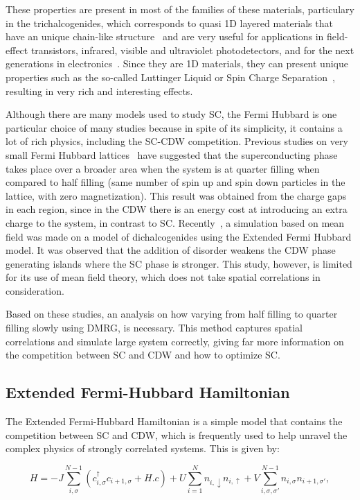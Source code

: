 \documentclass{article}
\begin{document}
These properties are present in most of the families of these materials, particulary in the trichalcogenides, which corresponds to quasi 1D layered materials that have an unique chain-like structure~\cite{trical} and are very useful for applications in field-effect transistors, infrared, visible and ultraviolet photodetectors, and for the next generations in electronics~\cite{trical}. Since they are 1D materials, they can present unique properties such as the so-called Luttinger Liquid or Spin Charge Separation~\cite{Giamarchi}, resulting in very rich and interesting effects.

Although there are many models used to study SC, the Fermi Hubbard is one particular choice of many studies because in spite of its simplicity, it contains a lot of rich physics, including the SC-CDW competition. Previous studies on very small Fermi Hubbard lattices~\cite{quarterfilling} have suggested that the superconducting phase takes place over a broader area when the system is at quarter filling when compared to half filling (same number of spin up and spin down particles in the lattice, with zero magnetization). This result was obtained from the charge gaps in each region, since in the CDW there is an energy cost at introducing an extra charge to the system, in contrast to SC. Recently~\cite{MeanField}, a simulation based on mean field was made on a model of dichalcogenides using the Extended Fermi Hubbard model. It was observed that the addition of disorder weakens the CDW phase generating islands where the SC phase is stronger. This study, however, is limited for its use of mean field theory, which does not take spatial correlations in consideration. 

Based on these studies, an analysis on how varying from half filling to quarter filling slowly using DMRG, is necessary. This method captures spatial correlations and simulate large system correctly, giving far more information on the competition between SC and CDW and how to optimize SC.

\subsection{Extended Fermi-Hubbard Hamiltonian}

The Extended Fermi-Hubbard Hamiltonian is a simple model that contains the competition between SC and CDW, which is frequently used to help unravel the complex physics of strongly correlated systems. This is given by:

\begin{equation}
    H=-J\sum^{N-1}_{i,\sigma}{(c^{\dagger}_{i,\sigma}c_{i+1,\sigma} + H.c)}+U\sum^{N}_{i=1}{n_{i,\downarrow}n_{i,\uparrow}} + V\sum^{N-1}_{i,\sigma,\sigma'}{n_{i,\sigma}n_{i+1,\sigma'}},
\end{equation}
\end{document}
